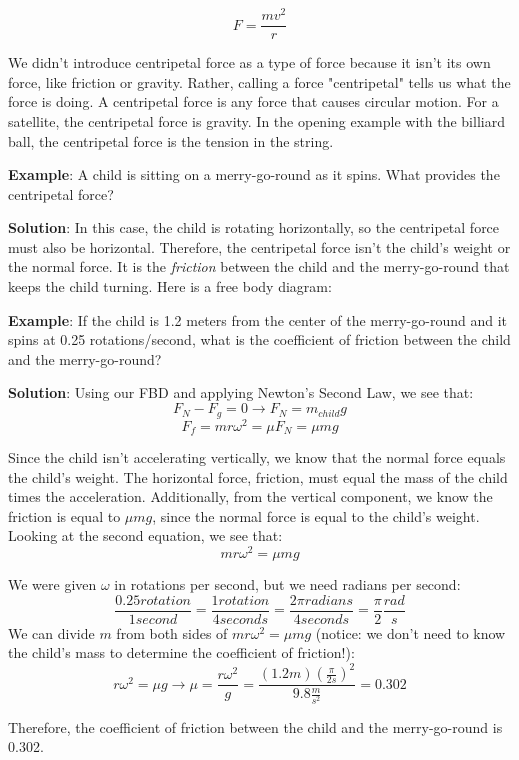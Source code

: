 $$F = \frac{m v^2}{r}$$

We didn't introduce centripetal force as a type of force because it isn't its own force, like friction or gravity. Rather, calling a force "centripetal" tells us what the force is doing. A centripetal force is any force that causes circular motion. For a satellite, the centripetal force is gravity. In the opening example with the billiard ball, the centripetal force is the tension in the string. 

\textbf{Example}: A child is sitting on a merry-go-round as it spins. What provides the centripetal force? 

\textbf{Solution}: In this case, the child is rotating horizontally, so the centripetal force must also be horizontal. Therefore, the centripetal force isn't the child's weight or the normal force. It is the \textit{friction} between the child and the merry-go-round that keeps the child turning. Here is a free body diagram:


\textbf{Example}: If the child is 1.2 meters from the center of the merry-go-round and it spins at 0.25 rotations/second, what is the coefficient of friction between the child and the merry-go-round?

\textbf{Solution}: Using our FBD and applying Newton's Second Law, we see that:
$$F_N - F_g = 0 \to F_N = m_{child}g$$
$$F_f = m r \omega^2 = \mu F_N = \mu m g$$

Since the child isn't accelerating vertically, we know that the normal force equals the child's weight. The horizontal force, friction, must equal the mass of the child times the acceleration. Additionally, from the vertical component, we know the friction is equal to $\mu m g$, since the normal force is equal to the child's weight. Looking at the second equation, we see that:
$$m r \omega^2 = \mu m g$$

We were given $\omega$ in rotations per second, but we need radians per second:
$$\frac{0.25 rotation}{1 second} = \frac{1 rotation}{4 seconds} = \frac{2\pi radians}{4 seconds} = \frac{\pi}{2} \frac{rad}{s}$$
We can divide $m$ from both sides of $mr\omega^2 = \mu m g$ (notice: we don't need to know the child's mass to determine the coefficient of friction!):
$$r \omega^2 = \mu g \to \mu = \frac{r \omega^2}{g} = \frac{\left( 1.2 m \right) \left( \frac{\pi}{2 s} \right)^2}{9.8 \frac{m}{s^2}} = 0.302$$

Therefore, the coefficient of friction between the child and the merry-go-round is 0.302. 

